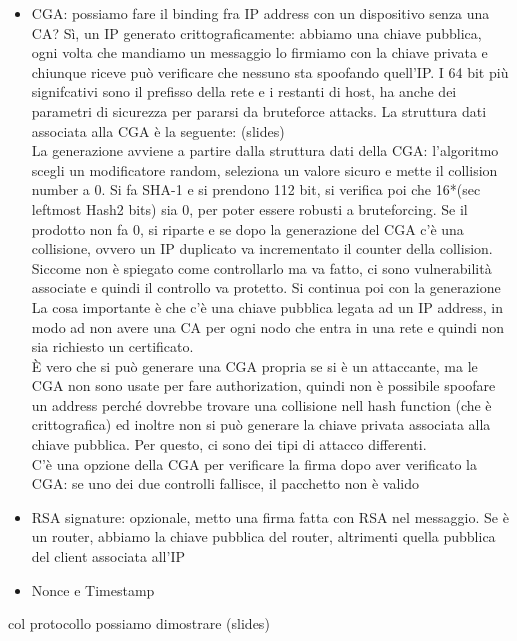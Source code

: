 \documentclass[12pt, oneside]{extbook} %
\begin{document}
\begin{itemize}
\item CGA: possiamo fare il binding fra IP address con un dispositivo senza una CA? Sì, un IP generato crittograficamente: abbiamo una chiave pubblica, ogni volta che mandiamo un messaggio lo firmiamo con la chiave privata e chiunque riceve può verificare che nessuno  sta spoofando quell'IP. I 64 bit più signifcativi sono il prefisso della rete e i restanti di host, ha anche dei parametri di sicurezza per pararsi da bruteforce attacks. La struttura dati associata alla CGA è la seguente: (slides)\\ La generazione avviene a partire dalla struttura dati della CGA: l'algoritmo scegli un modificatore random, seleziona un valore sicuro e mette il collision number a 0. Si fa SHA-1 e si prendono 112 bit, si verifica poi che 16*(sec leftmost Hash2 bits) sia 0, per poter essere robusti a bruteforcing. Se il prodotto non fa 0, si riparte e se dopo la generazione del CGA c'è una collisione, ovvero un IP duplicato va incrementato il counter della collision.\\ Siccome non è spiegato come controllarlo ma va fatto, ci sono vulnerabilità associate e quindi il controllo va protetto. Si continua poi con la generazione
\\ La cosa importante è che c'è una chiave pubblica legata ad un IP address, in modo ad non avere una CA per ogni nodo che entra in una rete e quindi non sia richiesto un certificato.\\ È vero che si può generare una CGA propria se si è un attaccante, ma le CGA non sono usate per fare authorization, quindi non è possibile spoofare un address perché dovrebbe trovare una collisione nell hash function (che è crittografica) ed inoltre non si può generare la chiave privata associata alla chiave pubblica. Per questo, ci sono dei tipi di attacco differenti.\\ C'è una opzione della CGA per verificare la firma dopo aver verificato la CGA: se uno dei due controlli fallisce, il pacchetto non è valido
\item RSA signature: opzionale, metto una firma fatta con RSA nel messaggio. Se è un router, abbiamo la chiave pubblica del router, altrimenti quella pubblica del client associata all'IP
\item Nonce e Timestamp
\end{itemize}
col protocollo possiamo dimostrare (slides)
\end{document}
